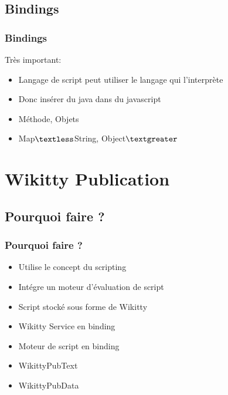 \documentclass[12pt,a4paper,utf8x]{beamer}
\begin{document}
\subsection{Bindings}
\begin{frame}\frametitle{Bindings}

Très important:
\begin{itemize}
\item Langage de script peut utiliser le langage qui l'interprète
\item Donc insérer du java dans du javascript
\item Méthode, Objets 
\item Map$\textless$String, Object$\textgreater$
\end{itemize}
\end{frame}


\section{Wikitty Publication} 
\subsection{Pourquoi faire ?}
\begin{frame}\frametitle{Pourquoi faire ?}
\begin{itemize}
\item Utilise le concept du scripting
\item Intégre un moteur d'évaluation de script
\item Script stocké sous forme de Wikitty
\item Wikitty Service en binding
\item Moteur de script en binding
\item WikittyPubText
\item WikittyPubData
\end{itemize}

\end{frame}
\end{document}
